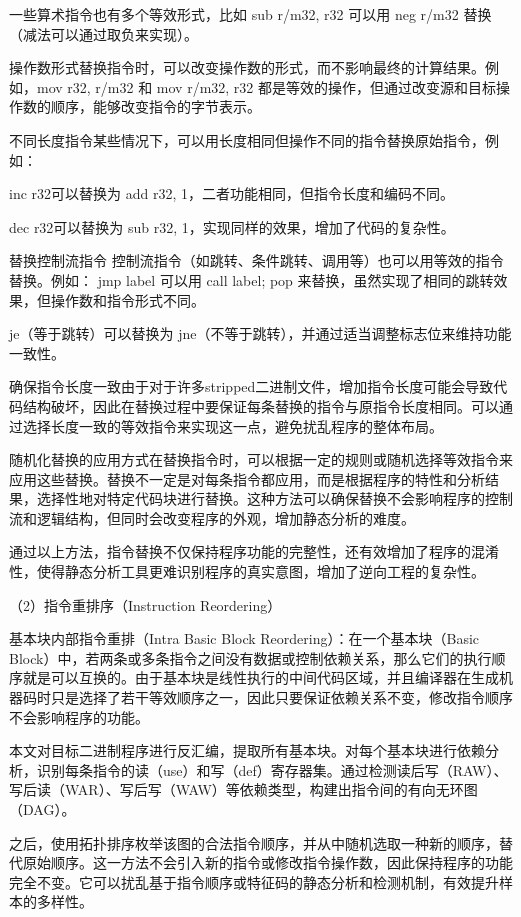 一些算术指令也有多个等效形式，比如 sub r/m32, r32 可以用 neg r/m32 替换（减法可以通过取负来实现）。

操作数形式替换指令时，可以改变操作数的形式，而不影响最终的计算结果。例如，mov r32, r/m32 和 mov r/m32, r32 都是等效的操作，但通过改变源和目标操作数的顺序，能够改变指令的字节表示。

不同长度指令某些情况下，可以用长度相同但操作不同的指令替换原始指令，例如：

inc r32可以替换为 add r32, 1，二者功能相同，但指令长度和编码不同。

dec r32可以替换为 sub r32, 1，实现同样的效果，增加了代码的复杂性。

替换控制流指令 控制流指令（如跳转、条件跳转、调用等）也可以用等效的指令替换。例如：
jmp label 可以用 call label; pop 来替换，虽然实现了相同的跳转效果，但操作数和指令形式不同。

je（等于跳转）可以替换为 jne（不等于跳转），并通过适当调整标志位来维持功能一致性。

确保指令长度一致由于对于许多stripped二进制文件，增加指令长度可能会导致代码结构破坏，因此在替换过程中要保证每条替换的指令与原指令长度相同。可以通过选择长度一致的等效指令来实现这一点，避免扰乱程序的整体布局。

随机化替换的应用方式在替换指令时，可以根据一定的规则或随机选择等效指令来应用这些替换。替换不一定是对每条指令都应用，而是根据程序的特性和分析结果，选择性地对特定代码块进行替换。这种方法可以确保替换不会影响程序的控制流和逻辑结构，但同时会改变程序的外观，增加静态分析的难度。

通过以上方法，指令替换不仅保持程序功能的完整性，还有效增加了程序的混淆性，使得静态分析工具更难识别程序的真实意图，增加了逆向工程的复杂性。

（2）指令重排序（Instruction Reordering）

基本块内部指令重排（Intra Basic Block Reordering）：在一个基本块（Basic Block）中，若两条或多条指令之间没有数据或控制依赖关系，那么它们的执行顺序就是可以互换的。由于基本块是线性执行的中间代码区域，并且编译器在生成机器码时只是选择了若干等效顺序之一，因此只要保证依赖关系不变，修改指令顺序不会影响程序的功能。

本文对目标二进制程序进行反汇编，提取所有基本块。对每个基本块进行依赖分析，识别每条指令的读（use）和写（def）寄存器集。通过检测读后写（RAW）、写后读（WAR）、写后写（WAW）等依赖类型，构建出指令间的有向无环图（DAG）。

之后，使用拓扑排序枚举该图的合法指令顺序，并从中随机选取一种新的顺序，替代原始顺序。这一方法不会引入新的指令或修改指令操作数，因此保持程序的功能完全不变。它可以扰乱基于指令顺序或特征码的静态分析和检测机制，有效提升样本的多样性。

